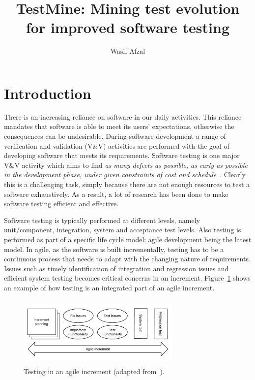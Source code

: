\documentclass[11pt, oneside]{article}   	%
\title{TestMine: Mining test evolution for improved software testing}
\author{Wasif Afzal}
\date{}							%
\begin{document}
\maketitle
\section{Introduction}
There is an increasing reliance on software in our daily activities. This reliance mandates that software is able to meet its users' expectations, otherwise the consequences can be undesirable. During software development a range of verification and validation (V\&V) activities are performed with the goal of developing software that meets its requirements. Software testing is one major V\&V activity which aims to find \textit{as many defects as possible, as early as possible in the development phase, under given constraints of cost and schedule}~\cite{29119}. Clearly this is a challenging task, simply because there are not enough resources to test a software exhaustively. As a result, a lot of research has been done to make software testing efficient and effective. 

Software testing is typically performed at different levels, namely unit/component, integration, system and acceptance test levels. Also testing is performed as part of a specific life cycle model; agile development being the latest model. In agile, as the software is built incrementally, testing has to be a continuous process that needs to adapt with the changing nature of requirements. Issues such as timely identification of integration and regression issues and efficient system testing becomes critical concerns in an increment. Figure~\ref{fig:agile_incr} shows an example of how testing is an integrated part of an agile increment. 

\begin{figure} [h]
   \centering
   \includegraphics[width=80mm,height=35mm]{agile_incr.pdf}
   \caption{Testing in an agile increment (adapted from~\cite{29119}).}
   \label{fig:agile_incr}
\end{figure}
\end{document}
